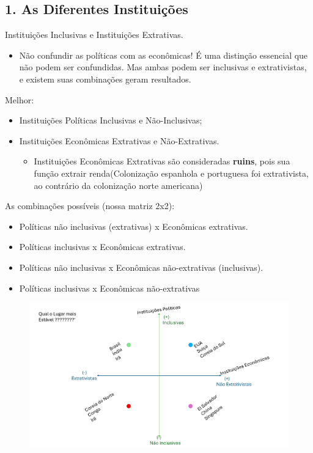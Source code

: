 \documentclass[a4paper,12pt]{article}[abntex2]
\begin{document}
\subsection{\textbf{1. As Diferentes Instituições}}

Instituições Inclusivas e Instituições Extrativas.\begin{itemize}
    \item Não confundir as políticas com as econômicas! É uma distinção essencial que não podem ser confundidas. Mas ambas podem ser inclusivas e extrativistas, e existem suas combinações geram resultados.
\end{itemize}

Melhor:\begin{itemize} 
    \item Instituições Políticas Inclusivas e Não-Inclusivas;
    \item Instituições Econômicas Extrativas e Não-Extrativas.\begin{itemize}
        \item Instituições Econômicas Extrativas são consideradas \textbf{ruins}, pois sua função extrair renda(Colonização espanhola e portuguesa foi extrativista, ao contrário da colonização norte americana)
    \end{itemize}
\end{itemize}

As combinações possíveis (nossa matriz 2x2):\begin{itemize}
    \item Políticas não inclusivas (extrativas) x Econômicas extrativas.
    \item Políticas inclusivas x Econômicas extrativas.
    \item Políticas não inclusivas x Econômicas não-extrativas (inclusivas).
    \item Políticas inclusivas x Econômicas não-extrativas
\end{itemize}

\begin{figure}[H]
    \centering
    \includegraphics[width=0.5\linewidth]{Imagens/a3i1.png}
\end{figure}
\end{document}
